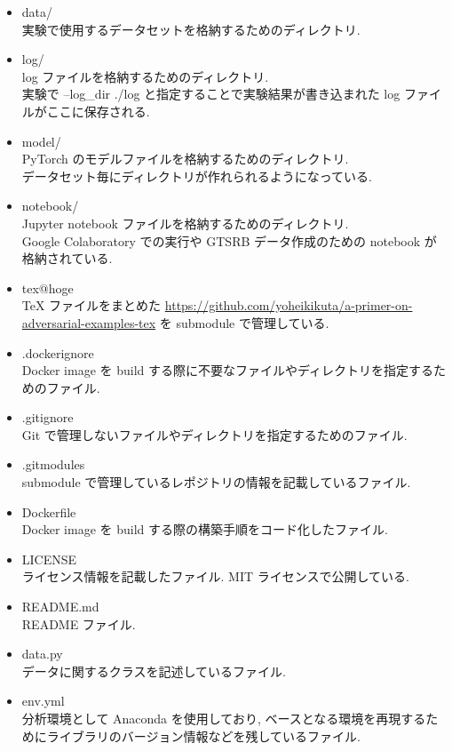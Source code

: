 \begin{itemize}
  \item data/\\
  実験で使用するデータセットを格納するためのディレクトリ.
  \item log/\\
  log ファイルを格納するためのディレクトリ.\\
  実験で --log\_dir ./log と指定することで実験結果が書き込まれた log ファイルがここに保存される.
  \item model/\\
  PyTorch のモデルファイルを格納するためのディレクトリ.\\
  データセット毎にディレクトリが作れられるようになっている.
  \item notebook/\\
  Jupyter notebook ファイルを格納するためのディレクトリ.\\
  Google Colaboratory での実行や GTSRB データ作成のための notebook が格納されている.
  \item tex@hoge\\
  TeX ファイルをまとめた \href{https://github.com/yoheikikuta/a-primer-on-adversarial-examples-tex}{https://github.com/yoheikikuta/a-primer-on-adversarial-examples-tex} を submodule で管理している.
  \item .dockerignore\\
  Docker image を build する際に不要なファイルやディレクトリを指定するためのファイル.
  \item .gitignore\\
  Git で管理しないファイルやディレクトリを指定するためのファイル.
  \item .gitmodules\\
  submodule で管理しているレポジトリの情報を記載しているファイル.
  \item Dockerfile\\
  Docker image を build する際の構築手順をコード化したファイル.
  \item LICENSE\\
  ライセンス情報を記載したファイル.
  MIT ライセンスで公開している.
  \item README.md\\
  README ファイル.
  \item data.py\\
  データに関するクラスを記述しているファイル.
  \item env.yml\\
  分析環境として Anaconda を使用しており, ベースとなる環境を再現するためにライブラリのバージョン情報などを残しているファイル.

\end{itemize}
